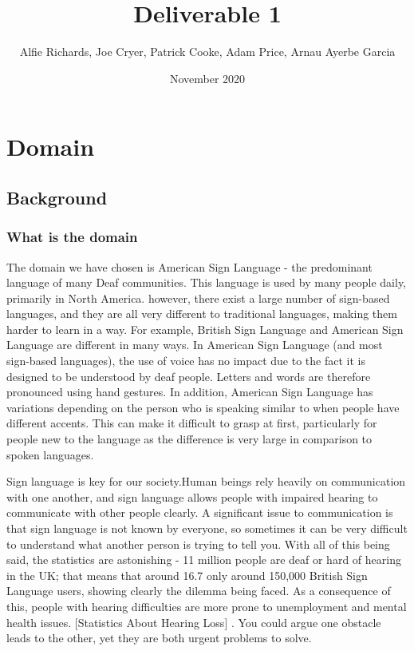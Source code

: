 \documentclass[10pt]{article}
\title{Deliverable 1}
\author{Alfie Richards, Joe Cryer, Patrick Cooke, Adam Price, Arnau Ayerbe Garcia}
\begin{document}
\date{November 2020}
\maketitle
\tableofcontents

\newpage

\section{Domain}
\subsection{Background}
\subsubsection{What is the domain}

The domain we have chosen is American Sign Language - the predominant language of many Deaf 
communities. This language is used by many people daily, primarily in North America. however, there exist a large number of 
sign-based languages, and they are all very different to traditional languages, making them harder to learn in a way. For example, 
British Sign Language and American Sign Language are different in many ways. In American Sign Language (and most sign-based languages), 
the use of voice has no impact due to the fact it is designed 
to be understood by deaf people. Letters and words are therefore pronounced using hand gestures. In addition, American Sign Language has variations depending on the person who is speaking 
similar to when people have different accents. 
\cite{national_institute_of_deafness_and_other_communication_disorders_2020} This can make it 
difficult to grasp at first, particularly for people new to the language as the difference is very large in comparison to spoken languages. 

Sign language is key for our society.Human beings rely heavily on communication with 
one another, and sign language allows people with impaired hearing to communicate with other people clearly. 
A significant issue to communication is that sign language is not known by everyone, so 
sometimes it can be very difficult to understand what another person is trying to tell you. With all 
of this being said, the statistics are astonishing - 11 million people are deaf or hard of hearing in 
the UK; that means that around 16.7%
only around 150,000 British Sign Language users, showing clearly the dilemma being faced. As 
a consequence of this, people with hearing difficulties are more prone to unemployment and mental 
health issues. [Statistics About Hearing Loss] . You could argue one obstacle leads to the other, 
yet they are both urgent problems to solve.
\end{document}
